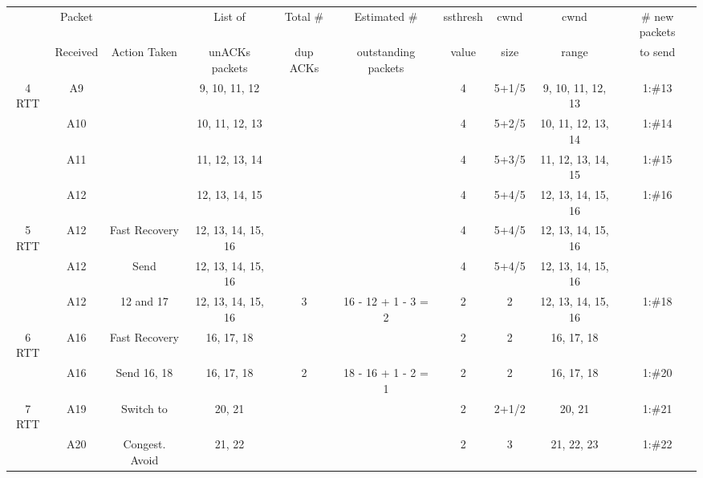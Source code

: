 \documentclass[12pt]{article}
\begin{document}
\begin{landscape}
\begin{table}[h!]
\centering

\begin{tabular}{|c|c|c|c|c|c|c|c|c|c|}
\bottomrule
\rowcolor{gray!50}\setcounter{rownum}{0}

& Packet && List of  & Total \# & Estimated \#  & ssthresh & cwnd & cwnd & \# new packets \\   \rowcolor{gray!50}
\multirow{-2}{*}{Time} & Received & \multirow{-2}{*}{Action Taken} & unACKs packets & dup ACKs & outstanding packets & value & size & range & to send \\\toprule\bottomrule

4 RTT  & A9   & & 9, 10, 11, 12   & & & 4 & 5+1/5 &   9, 10, 11, 12, 13 & 1:\#13	\\
	 & A10 & & 10, 11, 12, 13 & & & 4 & 5+2/5 & 10, 11, 12, 13, 14 & 1:\#14	\\
	 & A11 & & 11, 12, 13, 14 & & & 4 & 5+3/5 & 11, 12, 13, 14, 15 & 1:\#15	\\
	 & A12 & & 12, 13, 14, 15 & & & 4 & 5+4/5 & 12, 13, 14, 15, 16 & 1:\#16	\\

\toprule\bottomrule
5 RTT 	& A12 & Fast Recovery & 12, 13, 14, 15, 16 &  & & 4 & 5+4/5 & 12, 13, 14, 15, 16 & 	\\
	& A12 & Send& 12, 13, 14, 15, 16 & & & 4 & 5+4/5 & 12, 13, 14, 15, 16 & 	\\
	& A12 & 12 and 17 & 12, 13, 14, 15, 16 & 3 & 16 - 12 + 1 - 3 = 2 & 2 & 2 & 12, 13, 14, 15, 16 & 1:\#18	\setcounter{rownum}{1}\\
	
\toprule\bottomrule
6 RTT & A16 & Fast Recovery & 16, 17, 18 & & & 2 & 2 & 16, 17, 18 & 	\\
	& A16 & Send 16, 18     & 16, 17, 18 & 2 & 18 - 16 + 1 - 2 = 1 & 2 & 2 & 16, 17, 18 & 1:\#20	\\
	
\toprule\bottomrule
7 RTT & A19 & Switch to & 20, 21 & & & 2 & 2+1/2 & 20, 21 & 1:\#21 \\
	& A20 & Congest. Avoid & 21, 22 & & & 2 & 3 & 21, 22, 23 & 1:\#22 \\

\toprule
\end{tabular}

\end{table}\hspace{-4cm}
\end{landscape}
\end{document}

